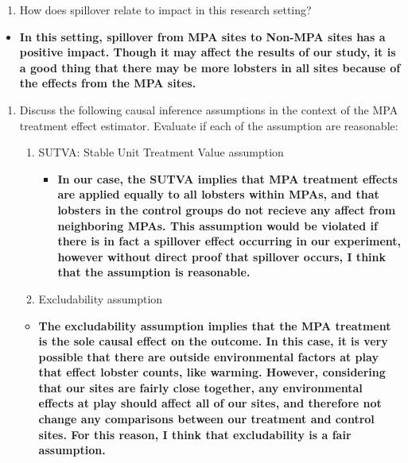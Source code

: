 \documentclass[
]{article}
\providecommand{\tightlist}{%
  \setlength{\itemsep}{0pt}\setlength{\parskip}{0pt}}
\begin{document}
\begin{enumerate}
\def\labelenumi{\alph{enumi}.}
\setcounter{enumi}{2}
\tightlist
\item
  How does spillover relate to impact in this research setting?
\end{enumerate}

\begin{itemize}
\tightlist
\item
  \textbf{In this setting, spillover from MPA sites to Non-MPA sites has
  a positive impact. Though it may affect the results of our study, it
  is a good thing that there may be more lobsters in all sites because
  of the effects from the MPA sites.}
\end{itemize}

\begin{enumerate}
\def\labelenumi{\alph{enumi}.}
\setcounter{enumi}{3}
\item
  Discuss the following causal inference assumptions in the context of
  the MPA treatment effect estimator. Evaluate if each of the assumption
  are reasonable:

  \begin{enumerate}
  \def\labelenumii{\arabic{enumii})}
  \item
    SUTVA: Stable Unit Treatment Value assumption

    \begin{itemize}
    \tightlist
    \item
      \textbf{In our case, the SUTVA implies that MPA treatment effects
      are applied equally to all lobsters within MPAs, and that lobsters
      in the control groups do not recieve any affect from neighboring
      MPAs. This assumption would be violated if there is in fact a
      spillover effect occurring in our experiment, however without
      direct proof that spillover occurs, I think that the assumption is
      reasonable.}
    \end{itemize}
  \item
    Excludability assumption
  \end{enumerate}

  \begin{itemize}
  \tightlist
  \item
    \textbf{The excludability assumption implies that the MPA treatment
    is the sole causal effect on the outcome. In this case, it is very
    possible that there are outside environmental factors at play that
    effect lobster counts, like warming. However, considering that our
    sites are fairly close together, any environmental effects at play
    should affect all of our sites, and therefore not change any
    comparisons between our treatment and control sites. For this
    reason, I think that excludability is a fair assumption.}
  \end{itemize}
\end{enumerate}
\end{document}
